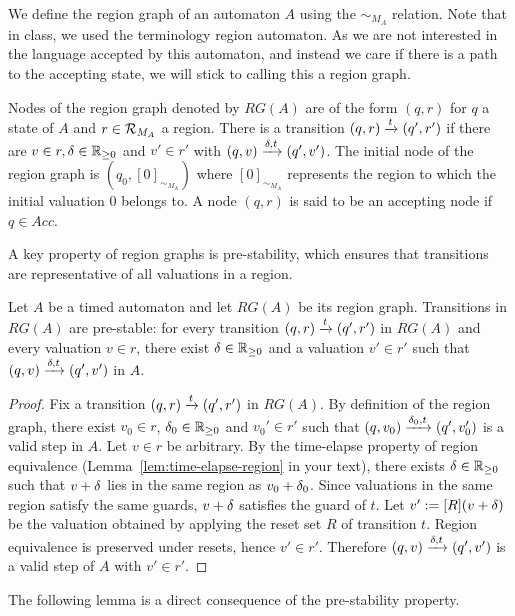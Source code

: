 We define the region graph of an automaton $A$ using the $\sim_{M_A}$ relation. Note that in class, we used the terminology region automaton. As we are not interested in the language accepted by this automaton, and instead we care if there is a path to the accepting state, we will stick to calling this a region graph.

\begin{definition}
Nodes of the region graph denoted by $RG(A)$ are of the form $(q, r)$ for $q$ a state of $A$ and $r \in {\mathcal R}_{M_A}$ a region. There is a transition $(q, r) \xrightarrow{t} (q', r')$ if there are $v \in r, \delta \in \mathbb{R}_{\ge 0}$ and $v' \in r'$ with $(q, v) \xrightarrow{\delta, t} (q', v')$. The initial node of the region graph is $(q_0, [0]_{\sim_{M_A}})$ where $[0]_{\sim_{M_A}}$ represents the region to which the initial valuation $0$ belongs to. A node $(q, r)$ is said to be an accepting node if $q \in Acc$.
\end{definition}

A key property of region graphs is pre-stability, which ensures that transitions are representative of all valuations in a region.

\begin{lemma}
\label{lem:prestability}
Let $A$ be a timed automaton and let $RG(A)$ be its region graph. Transitions in $RG(A)$ are pre-stable: for every transition $(q,r)\xrightarrow{t}(q',r')$ in $RG(A)$ and every valuation $v \in r$, there exist $\delta \in \mathbb{R}_{\ge 0}$ and a valuation $v' \in r'$ such that $(q,v)\xrightarrow{\delta,t}(q',v')$ in $A$.
\end{lemma}

\begin{proof}
Fix a transition $(q,r)\xrightarrow{t}(q',r')$ in $RG(A)$. By definition of the region graph, there exist $v_0 \in r$, $\delta_0 \in \mathbb{R}_{\ge 0}$ and $v_0' \in r'$ such that $(q,v_0)\xrightarrow{\delta_0,t}(q',v_0')$ is a valid step in $A$. Let $v \in r$ be arbitrary. By the time-elapse property of region equivalence (Lemma~\ref{lem:time-elapse-region} in your text), there exists $\delta \in \mathbb{R}_{\ge 0}$ such that $v+\delta$ lies in the same region as $v_0+\delta_0$. Since valuations in the same region satisfy the same guards, $v+\delta$ satisfies the guard of $t$. Let $v' := [R](v+\delta)$ be the valuation obtained by applying the reset set $R$ of transition $t$. Region equivalence is preserved under resets, hence $v' \in r'$. Therefore $(q,v)\xrightarrow{\delta,t}(q',v')$ is a valid step of $A$ with $v' \in r'$. 
\end{proof}

The following lemma is a direct consequence of the pre-stability property.


